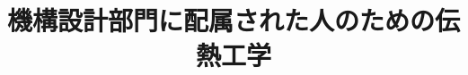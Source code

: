 \documentclass[a4paper]{article}
\begin{document}
\title{機構設計部門に配属された人のための伝熱工学}
\maketitle


\end{document}
